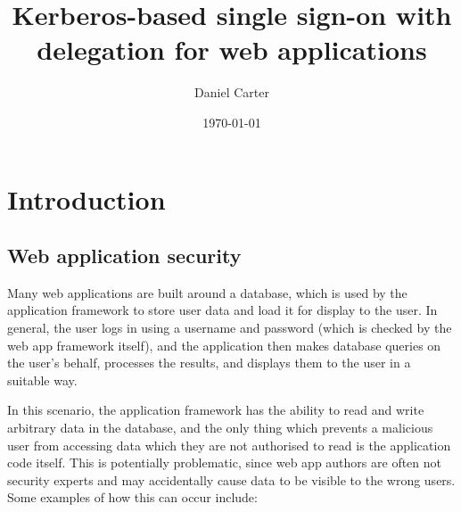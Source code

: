 \documentclass{article}
\title{Kerberos-based single sign-on with delegation for web applications}
\author{Daniel Carter}
\date {\today}
\begin{document}
\maketitle

\section{Introduction}

\subsection{Web application security}
Many web applications are built around a database, which is used by the application framework to store user data and load it for display to the user. In general, the user logs in using a username and password (which is checked by the web app framework itself), and the application then makes database queries on the user's behalf, processes the results, and displays them to the user in a suitable way.

In this scenario, the application framework has the ability to read and write arbitrary data in the database, and the only thing which prevents a malicious user from accessing data which they are not authorised to read is the application code itself. This is potentially problematic, since web app authors are often not security experts and may accidentally cause data to be visible to the wrong users. Some examples of how this can occur include:
\end{document}
